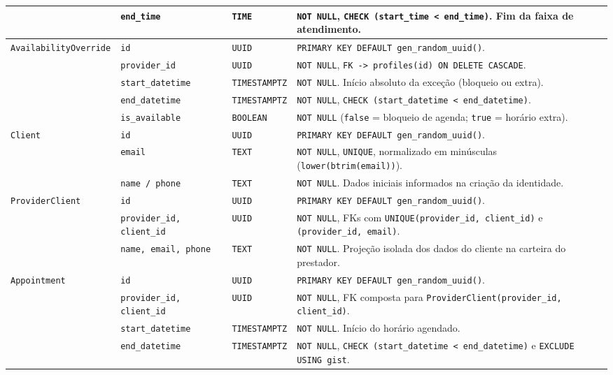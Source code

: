 \documentclass[12pt,a4paper]{article}
\begin{document}
\begin{table}[hbt]
\begin{tabularx}{\textwidth}{|l|l|l|X|}
 & \texttt{end\_time} & \texttt{TIME} & \texttt{NOT NULL}, \texttt{CHECK (start\_time < end\_time)}. Fim da faixa de atendimento. \\ \hline
\multirow{4}{*}{\texttt{AvailabilityOverride}} 
 & \texttt{id} & \texttt{UUID} & \texttt{PRIMARY KEY DEFAULT gen\_random\_uuid()}. \\
 & \texttt{provider\_id} & \texttt{UUID} & \texttt{NOT NULL}, \texttt{FK -> profiles(id) ON DELETE CASCADE}. \\
 & \texttt{start\_datetime} & \texttt{TIMESTAMPTZ} & \texttt{NOT NULL}. Início absoluto da exceção (bloqueio ou extra). \\
 & \texttt{end\_datetime} & \texttt{TIMESTAMPTZ} & \texttt{NOT NULL}, \texttt{CHECK (start\_datetime < end\_datetime)}. \\
 & \texttt{is\_available} & \texttt{BOOLEAN} & \texttt{NOT NULL} (\texttt{false} = bloqueio de agenda; \texttt{true} = horário extra). \\ \hline
\multirow{3}{*}{\texttt{Client}} 
 & \texttt{id} & \texttt{UUID} & \texttt{PRIMARY KEY DEFAULT gen\_random\_uuid()}. \\
 & \texttt{email} & \texttt{TEXT} & \texttt{NOT NULL}, \texttt{UNIQUE}, normalizado em minúsculas (\texttt{lower(btrim(email))}). \\
 & \texttt{name / phone} & \texttt{TEXT} & \texttt{NOT NULL}. Dados iniciais informados na criação da identidade. \\ \hline
\multirow{3}{*}{\texttt{ProviderClient}} 
 & \texttt{id} & \texttt{UUID} & \texttt{PRIMARY KEY DEFAULT gen\_random\_uuid()}. \\
 & \texttt{provider\_id, client\_id} & \texttt{UUID} & \texttt{NOT NULL}, FKs com \texttt{UNIQUE(provider\_id, client\_id)} e \texttt{(provider\_id, email)}. \\
 & \texttt{name, email, phone} & \texttt{TEXT} & \texttt{NOT NULL}. Projeção isolada dos dados do cliente na carteira do prestador. \\ \hline
\multirow{6}{*}{\texttt{Appointment}} 
 & \texttt{id} & \texttt{UUID} & \texttt{PRIMARY KEY DEFAULT gen\_random\_uuid()}. \\
 & \texttt{provider\_id, client\_id} & \texttt{UUID} & \texttt{NOT NULL}, FK composta para \texttt{ProviderClient(provider\_id, client\_id)}. \\
 & \texttt{start\_datetime} & \texttt{TIMESTAMPTZ} & \texttt{NOT NULL}. Início do horário agendado. \\
 & \texttt{end\_datetime} & \texttt{TIMESTAMPTZ} & \texttt{NOT NULL}, \texttt{CHECK (start\_datetime < end\_datetime)} e \texttt{EXCLUDE USING gist}. \\

\end{tabularx}
\end{table}
\end{document}
